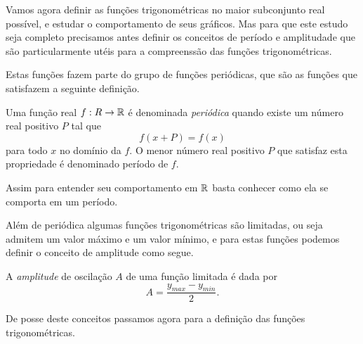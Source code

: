  Vamos agora definir as funções trigonométricas no maior subconjunto real possível, e estudar o comportamento de seus gráficos. Mas para que este estudo seja completo precisamos antes definir os conceitos de período e amplitudade que são particularmente utéis para a compreenssão das funções trigonométricas.
 
  Estas funções fazem parte do grupo de funções periódicas, que são as funções que satisfazem a seguinte definição.

  \begin{obs}
   Uma função real $f: R \rightarrow \mathbb{R}$ é denominada \emph{periódica} quando existe um número real positivo $P$ tal que
\begin{equation*}
f(x + P)= f(x)
\end{equation*}
   para todo $x$ no domínio da $f$. O menor número real positivo $P$ que satisfaz esta propriedade é denominado período de $f$.
  \end{obs}
  
  Assim para entender seu comportamento em $\mathbb{R}$ basta conhecer como ela se comporta em um período.
  
  Além de periódica algumas funções trigonométricas são limitadas, ou seja admitem um valor máximo e um valor mínimo, e para estas funções podemos definir o conceito de amplitude como segue.
  
  \begin{obs}
  A \emph{amplitude} de oscilação $A$ de uma função limitada é dada por
  \begin{equation*}
  A= \frac{y_{max} - y_{min}}{2} .
  \end{equation*}
  \end{obs}
  
  De posse deste conceitos passamos agora para a definição das funções trigonométricas.
  
